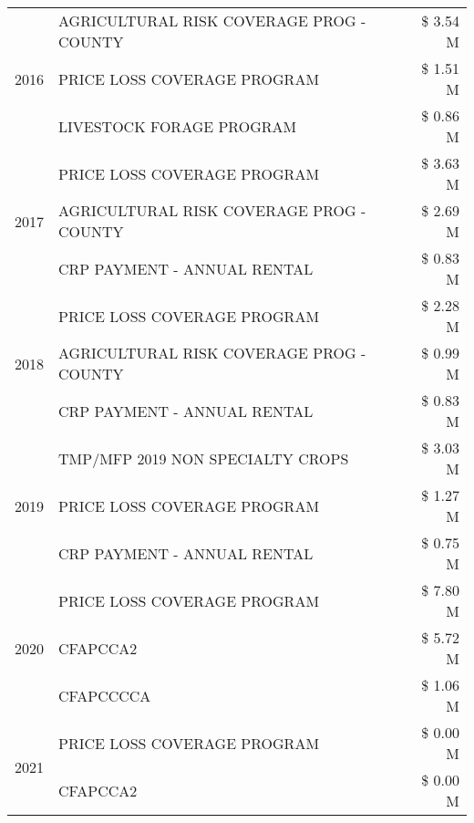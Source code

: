 \begin{tabular}{llr}
\multirow[t]{3}{*}{2016} & AGRICULTURAL RISK COVERAGE PROG - COUNTY      & \$ 3.54 M \\
 & PRICE LOSS COVERAGE PROGRAM                   & \$ 1.51 M \\
 & LIVESTOCK FORAGE PROGRAM                      & \$ 0.86 M \\
\cline{1-3}
\multirow[t]{3}{*}{2017} & PRICE LOSS COVERAGE PROGRAM & \$ 3.63 M \\
 & AGRICULTURAL RISK COVERAGE PROG - COUNTY & \$ 2.69 M \\
 & CRP PAYMENT - ANNUAL RENTAL & \$ 0.83 M \\
\cline{1-3}
\multirow[t]{3}{*}{2018} & PRICE LOSS COVERAGE PROGRAM & \$ 2.28 M \\
 & AGRICULTURAL RISK COVERAGE PROG - COUNTY & \$ 0.99 M \\
 & CRP PAYMENT - ANNUAL RENTAL & \$ 0.83 M \\
\cline{1-3}
\multirow[t]{3}{*}{2019} & TMP/MFP 2019 NON SPECIALTY CROPS & \$ 3.03 M \\
 & PRICE LOSS COVERAGE PROGRAM & \$ 1.27 M \\
 & CRP PAYMENT - ANNUAL RENTAL & \$ 0.75 M \\
\cline{1-3}
\multirow[t]{3}{*}{2020} & PRICE LOSS COVERAGE PROGRAM & \$ 7.80 M \\
 & CFAPCCA2 & \$ 5.72 M \\
 & CFAPCCCCA & \$ 1.06 M \\
\cline{1-3}
\multirow[t]{2}{*}{2021} & PRICE LOSS COVERAGE PROGRAM & \$ 0.00 M \\
 & CFAPCCA2 & \$ 0.00 M \\
\cline{1-3}
\bottomrule
\end{tabular}
